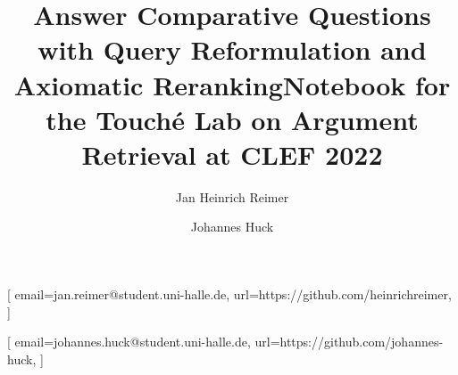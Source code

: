 \documentclass[
]{ceurart}
\begin{document}


\title{Answer Comparative Questions with Query Reformulation and Axiomatic Reranking}
\title[mode=sub]{Notebook for the Touch{\'e} Lab on Argument Retrieval at CLEF 2022}

\author[1]{Jan Heinrich Reimer}[%
email=jan.reimer@student.uni-halle.de,
url=https://github.com/heinrichreimer,
]
\address[1]{Martin-Luther-University Halle-Wittenberg,
Universitätsplatz 10, Halle, 06108, Germany}

\author[1]{Johannes Huck}[%
email=johannes.huck@student.uni-halle.de,
url=https://github.com/johannes-huck,
]



\maketitle








\end{document}
